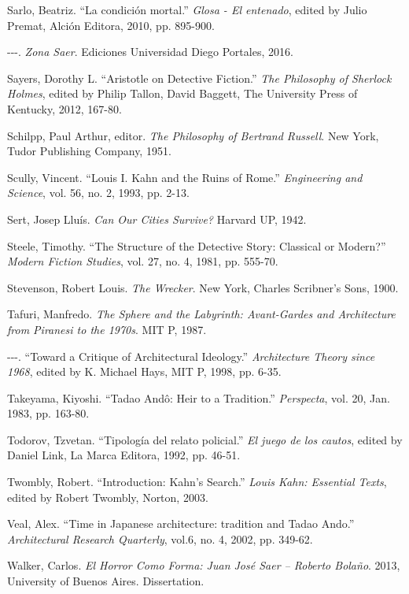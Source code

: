 \documentclass[11pt]{report}
\begin{document}
\begin{hangparas}{.25in}{1}
Sarlo, Beatriz. ``La condición mortal.'' \textit{Glosa - El entenado}, edited by Julio Premat, Alción Editora, 2010, pp. 895-900.

-{}-{}-. \textit{Zona Saer}. Ediciones Universidad Diego Portales, 2016.

Sayers, Dorothy L. ``Aristotle on Detective Fiction.'' \textit{The Philosophy of Sherlock Holmes}, edited by Philip Tallon, David Baggett, The University Press of Kentucky, 2012, 167-80. 

Schilpp, Paul Arthur, editor. \textit{The Philosophy of Bertrand Russell}. New York, Tudor Publishing Company, 1951.

Scully, Vincent. ``Louis I. Kahn and the Ruins of Rome.'' \textit{Engineering and Science}, vol. 56, no. 2, 1993, pp. 2-13.

Sert, Josep Lluís. \textit{Can Our Cities Survive?} Harvard UP, 1942.

Steele, Timothy. ``The Structure of the Detective Story: Classical or Modern?'' \textit{Modern Fiction Studies}, vol. 27, no. 4, 1981, pp. 555-70.

Stevenson, Robert Louis. \textit{The Wrecker}. New York, Charles Scribner's Sons, 1900.

Tafuri, Manfredo. \textit{The Sphere and the Labyrinth: Avant-Gardes and Architecture from Piranesi to the 1970s}. MIT P, 1987.

-{}-{}-. ``Toward a Critique of Architectural Ideology.'' \textit{Architecture Theory since 1968}, edited by K. Michael Hays, MIT P, 1998, pp. 6-35.

Takeyama, Kiyoshi. ``Tadao Andô: Heir to a Tradition.'' \textit{Perspecta}, vol. 20, Jan. 1983, pp. 163-80.

Todorov, Tzvetan. ``Tipología del relato policial.'' \textit{El juego de los cautos}, edited by Daniel Link, La Marca Editora, 1992, pp. 46-51.

Twombly, Robert. ``Introduction: Kahn's Search.'' \textit{Louis Kahn: Essential Texts}, edited by Robert Twombly, Norton, 2003.

Veal, Alex. ``Time in Japanese architecture: tradition and Tadao Ando.'' \textit{Architectural Research Quarterly}, vol.6, no. 4, 2002, pp. 349-62.

Walker, Carlos. \textit{El Horror Como Forma: Juan José Saer -- Roberto Bolaño}. 2013, University of Buenos Aires. Dissertation.

\end{hangparas}
\end{document}
